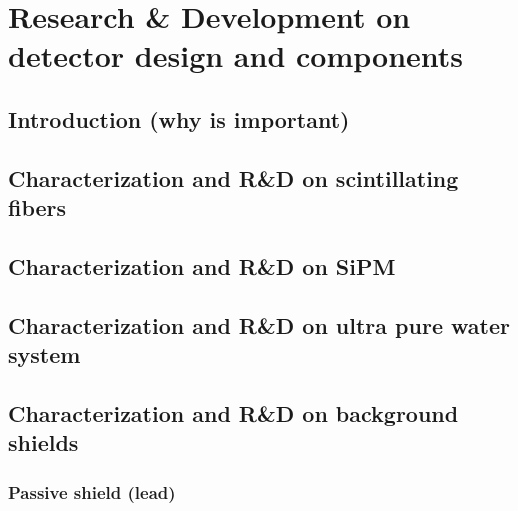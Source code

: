 \documentclass[12pt,a4paper]{book}
\begin{document}
\chapter[Research \& Development]{Research \& Development on detector design and components}\label{chap:ResearchandDevelopment}
	\section{Introduction (why is important)}
	 \label{sec:IntroCharacterisation}
	\newpage
	
	\section[Characetrization fibers]{Characterization and R\&D on scintillating fibers}
	\label{sec:CharacterizationScintillatingFibers}
	\newpage
		
	\section[Characterization SiPM]{Characterization and R\&D on SiPM}
	\label{sec:CharacterizationSiPM}
	\newpage
	
	\section[Characetrization water system]{Characterization and R\&D on ultra pure water system}
	\label{sec:CharacterizationUltraPureWaterSystem}
	\newpage
		
	\section[Characterization shields]{Characterization and R\&D on background shields}
	\label{sec:RyDBackground}
	
	\subsection{Passive shield (lead)}
	 \label{subsec:CharacterizationPassiveShield}
					
\end{document}
